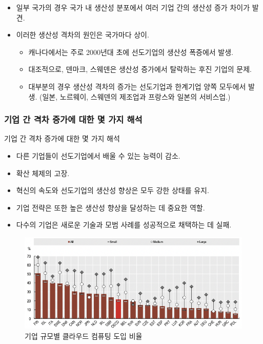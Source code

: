 \documentclass[aspectratio=169,xcolor=dvipsnames,handout]{beamer}
\begin{document}
\begin{frame}{}
    \begin{itemize}
        \item 일부 국가의 경우 국가 내 생산성 분포에서 여러 기업 간의 생산성 증가 차이가 발견.
        \item 이러한 생산성 격차의 원인은 국가마다 상이.
        \begin{itemize}
            \item 캐나다에서는 주로 2000년대 초에 선도기업의 생산성 폭증에서 발생.
            \item  대조적으로, 덴마크, 스웨덴은 생산성 증가에서 탈락하는 후진 기업의 문제.
            \item  대부분의 경우 생산성 격차의 증가는 선도기업과 한계기업 양쪽 모두에서 발생. (일본, 노르웨이, 스웨덴의 제조업과 프랑스와 일본의 서비스업.)
        \end{itemize}
    \end{itemize}
\end{frame}
\subsubsection{ 기업 간 격차 증가에 대한 몇 가지 해석}

\begin{frame}{ 기업 간 격차 증가에 대한 몇 가지 해석}
    \begin{itemize}
        \item 다른 기업들이 선도기업에서 배울 수 있는 능력이 감소.
        \item 확산 체제의 고장.
    \end{itemize}
\end{frame}

\begin{frame}{}
    \begin{itemize}
        \item 혁신의 속도와 선도기업의 생산성 향상은 모두 강한 상태를 유지.
        \item 기업 전략은 또한 높은 생산성 향상을 달성하는 데 중요한 역할.
        \item 다수의 기업은 새로운 기술과 모범 사례를 성공적으로 채택하는 데 실패.
    \end{itemize}
    \begin{figure}
        \centering
        \includegraphics[scale=.3]{pic/tpin1.7.png}
        \caption{기업 규모별 클라우드 컴퓨팅 도입 비율}
    \end{figure}
\end{frame}
\end{document}
